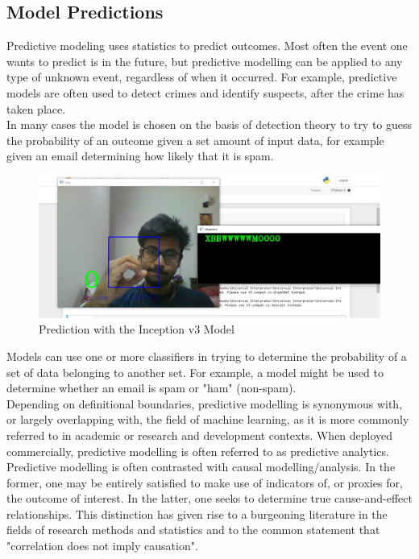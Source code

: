 \documentclass[14pt]{report}
\begin{document}
			\subsection{Model Predictions}
				Predictive modeling uses statistics to predict outcomes. Most often the event one wants to predict is in the future, but predictive modelling can be applied to any type of unknown event, regardless of when it occurred. For example, predictive models are often used to detect crimes and identify suspects, after the crime has taken place.\\

				In many cases the model is chosen on the basis of detection theory to try to guess the probability of an outcome given a set amount of input data, for example given an email determining how likely that it is spam.\\
				\begin{figure}[h]
					\includegraphics[width=\textwidth]{ModelPred.PNG}
					\centering
					\caption{Prediction with the Inception v3 Model}
					\label{fig:ModelPred}
				\end{figure}

				Models can use one or more classifiers in trying to determine the probability of a set of data belonging to another set. For example, a model might be used to determine whether an email is spam or "ham" (non-spam).\\

				Depending on definitional boundaries, predictive modelling is synonymous with, or largely overlapping with, the field of machine learning, as it is more commonly referred to in academic or research and development contexts. When deployed commercially, predictive modelling is often referred to as predictive analytics.\\

				Predictive modelling is often contrasted with causal modelling/analysis. In the former, one may be entirely satisfied to make use of indicators of, or proxies for, the outcome of interest. In the latter, one seeks to determine true cause-and-effect relationships. This distinction has given rise to a burgeoning literature in the fields of research methods and statistics and to the common statement that "correlation does not imply causation".\\
\end{document}
